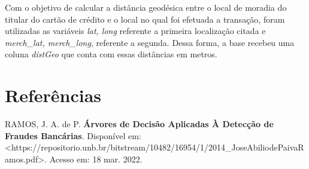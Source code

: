 \documentclass{article}
\begin{document}
Com o objetivo de calcular a distância geodésica entre o local de moradia do titular do cartão de crédito e o local no qual foi efetuada a transação, foram utilizadas as variáveis \textit{lat, long} referente a primeira localização citada e \textit{merch\_lat, merch\_long}, referente a segunda. Dessa forma, a base recebeu uma coluna \textit{distGeo} que conta com essas distâncias em metros.


\section{Referências}

RAMOS, J. A. de P. \textbf{Árvores de Decisão Aplicadas À Detecção de Fraudes Bancárias}. Disponível em: <https://repositorio.unb.br/bitstream/10482/16954/1/2014\_JoseAbiliodePaivaRamos.pdf>. Acesso em: 18 mar. 2022.
\end{document}
